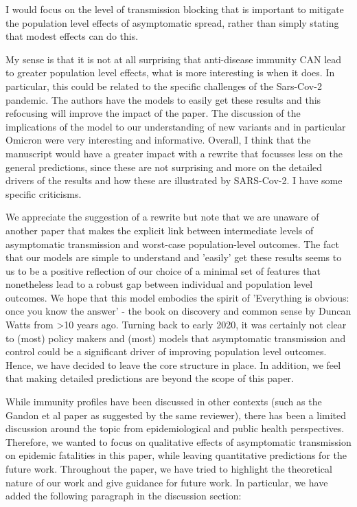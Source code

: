\documentclass[12pt]{article}
\newcommand{\revtext}{\textsf}
\begin{document}
\revtext{I would focus on the level of transmission blocking that is important to mitigate the population level effects of asymptomatic spread, rather than simply stating that modest effects can do this.}

\revtext{My sense is that it is not at all surprising that anti-disease immunity CAN lead to greater population level effects, what is more interesting is when it does. In particular, this could be related to the specific challenges of the Sars-Cov-2 pandemic. The authors have the models to easily get these results and this refocusing will improve the impact of the paper. The discussion of the implications of the model to our understanding of new variants and in particular Omicron were very interesting and informative. Overall, I think that the manuscript would have a greater impact with a rewrite that focusses less on the general predictions, since these are not surprising and more on the detailed drivers of the results and how these are illustrated by SARS-Cov-2. I have some specific criticisms.}

We appreciate the suggestion of a rewrite but note that we are unaware of another paper that makes the explicit link between intermediate levels of asymptomatic transmission and worst-case population-level outcomes.  
The fact that our models are simple to understand and 'easily' get these results seems to us to be a positive reflection of our choice of a minimal set of features that nonetheless lead to a robust gap between individual and population level outcomes.  
We hope that this model embodies the spirit of 'Everything is obvious: once you know the answer' - the book on discovery and common sense by Duncan Watts from >10 years ago. 
Turning back to early 2020, it was certainly not clear to (most) policy makers and (most) models that asymptomatic transmission and control could be a significant driver of improving population level outcomes.  
Hence, we have decided to leave the core structure in place. 
In addition, we feel that making detailed predictions are beyond the scope of this paper. 

While immunity profiles have been discussed in other contexts (such as the Gandon et al paper as suggested by the same reviewer), there has been a limited discussion around the topic from epidemiological and public health perspectives.
Therefore, we wanted to focus on qualitative effects of asymptomatic transmission on epidemic fatalities in this paper, while leaving quantitative predictions for the future work.
Throughout the paper, we have tried to highlight the theoretical nature of our work and give guidance for future work.
In particular, we have added the following paragraph in the discussion section:
\end{document}

